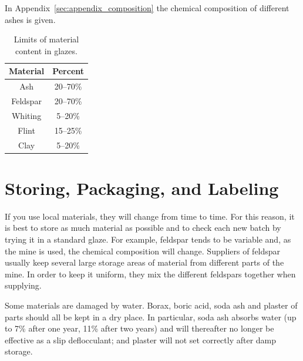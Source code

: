 In Appendix~\ref{sec:appendix_composition} the chemical composition of 
different ashes is given.
\begin{center}
        \renewcommand{\arraystretch}{1.5}
          \begin{table}\centering
    \begin{tabular}{|c|c|}\hline
      \textbf{Material}&\textbf{Percent}\\\hline\hline
      Ash&20--70\%\\\hline
      Feldspar&20--70\%\\\hline
      Whiting&5--20\%\\\hline
      Flint&15--25\%\\\hline
      Clay&5--20\%\\\hline
    \end{tabular}
    \caption{Limits of material content in glazes.}
    \label{tab:limits}
  \end{table}
\end{center}
\section{Storing, Packaging, and Labeling}
If you use local materials, they will change from time to time. For this 
reason, it is best to store as much material as possible and to check each new 
batch by trying it in a standard glaze. For example, feldspar tends to be 
variable and, as the mine is used, the chemical composition will change. 
Suppliers of feldspar usually keep several large storage areas of material from 
different parts of the mine. In order to keep it uniform, they mix the 
different feldspars together when supplying.

Some materials are damaged by water. Borax, boric acid, soda ash and plaster of 
parts should all be kept in a dry place. In particular, soda ash absorbs water 
(up to 7\% after one year, 11\% after two years) and will thereafter no longer 
be effective as a slip deflocculant; and plaster will not set correctly after 
damp storage.

